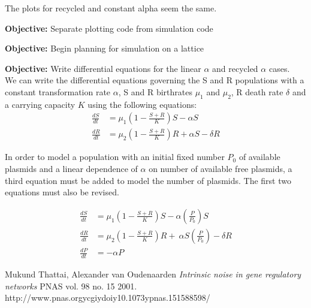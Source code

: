 \documentclass[oneside]{labbook}
\newcommand{\obj}[1]{\textbf{Objective:} #1\\}
\begin{document}
The plots for recycled and constant alpha seem the same.




\obj{Separate plotting code from simulation code}





\obj{Begin planning for simulation on a lattice}



\obj{Write differential equations for the linear $\alpha$ and recycled $\alpha$
cases.}

We can write the differential equations governing the S and R populations with a
constant transformation rate $\alpha$, S and R birthrates $\mu_1$ and $\mu_2$,
R death rate $\delta$ and a carrying capacity $K$ using the following equations:
\begin{align}
\frac{dS}{dt}& = \mu_1 \left(1 - \frac{S + R}{K}\right)S - \alpha S \\
\frac{dR}{dt}& = \mu_2 \left(1 - \frac{S + R}{K}\right)R + \alpha S - \delta R
\end{align}

In order to model a population with an initial fixed number $P_0$ of available
plasmids and a linear dependence of $\alpha$ on number of available free plasmids,
a third equation must be added to model the number of plasmids. The first two
equations must also be revised.

\begin{align}
  \frac{dS}{dt} & = \mu_1 \left(1 - \frac{S + R}{K}\right)S - \alpha
  \left( \frac{P}{P_0} \right) S \\
\frac{dR}{dt} & = \mu_2 \left(1 - \frac{S + R}{K}\right)R + \
  \alpha S  \left( \frac{P}{P_0} \right) - \delta R \\
\frac{dP}{dt} & = -\alpha P
\end{align}

\begin{thebibliography}{2}
Mukund Thattai, Alexander van Oudenaarden
\emph{Intrinsic noise in gene regulatory networks}
PNAS vol. 98 no. 15
2001.
http://www.pnas.orgycgiydoiy10.1073ypnas.151588598/
\end{thebibliography}
\end{document}
